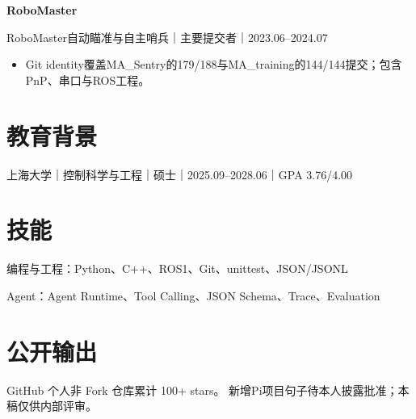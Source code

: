\documentclass[10pt,a4paper,UTF8,fontset=fandol]{ctexart}
\begin{document}
\vspace{0.6em}
{\bfseries\color{navy}RoboMaster}\par
{\color{muted}\fontsize{8.8}{10.8}\selectfont RoboMaster自动瞄准与自主哨兵｜主要提交者｜2023.06--2024.07}\par
\begin{itemize}
\item Git identity覆盖MA\_Sentry的179/188与MA\_training的144/144提交；包含PnP、串口与ROS工程。
\end{itemize}
\vspace{0.6em}
\section{教育背景}
上海大学｜控制科学与工程｜硕士｜2025.09--2028.06｜GPA 3.76/4.00
\section{技能}
编程与工程：Python、C++、ROS1、Git、unittest、JSON/JSONL\par
Agent：Agent Runtime、Tool Calling、JSON Schema、Trace、Evaluation\par
\section{公开输出}
GitHub 个人非 Fork 仓库累计 100+ stars。
\vfill{\color{muted}\fontsize{8.5}{10}\selectfont 新增Pi项目句子待本人披露批准；本稿仅供内部评审。}
\end{document}

